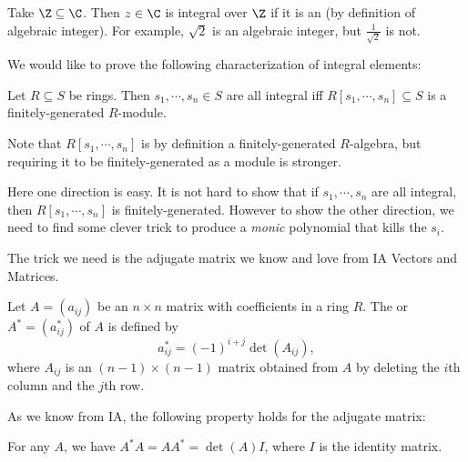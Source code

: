 \documentclass[a4paper]{article}
\begin{document}
\begin{eg}
  Take $\Z \subseteq \C$. Then $z \in \C$ is integral over $\Z$ if it is an  (by definition of algebraic integer). For example, $\sqrt{2}$ is an algebraic integer, but $\frac{1}{\sqrt{2}}$ is not.
\end{eg}

We would like to prove the following characterization of integral elements:
\begin{thm}
  Let $R \subseteq S$ be rings. Then $s_1, \cdots, s_n \in S$ are all integral iff $R[s_1, \cdots, s_n] \subseteq S$ is a finitely-generated $R$-module.
\end{thm}
Note that $R[s_1, \cdots, s_n]$ is by definition a finitely-generated $R$-algebra, but requiring it to be finitely-generated as a module is stronger.

Here one direction is easy. It is not hard to show that if $s_1, \cdots, s_n$ are all integral, then $R[s_1, \cdots, s_n]$ is finitely-generated. However to show the other direction, we need to find some clever trick to produce a \emph{monic} polynomial that kills the $s_i$.

The trick we need is the adjugate matrix we know and love from IA Vectors and Matrices.

\begin{defi}
  Let $A = (a_{ij})$ be an $n \times n$ matrix with coefficients in a ring $R$. The  or  $A^* = (a_{ij}^*)$ of $A$ is defined by
  \[
    a_{ij}^* = (-1)^{i + j} \det (A_{ij}),
  \]
  where $A_{ij}$ is an $(n-1)\times (n-1)$ matrix obtained from $A$ by deleting the $i$th column and the $j$th row.
\end{defi}

As we know from IA, the following property holds for the adjugate matrix:
\begin{prop}
  For any $A$, we have $A^*A = AA^* = \det(A) I$, where $I$ is the identity matrix.
\end{prop}
\end{document}
